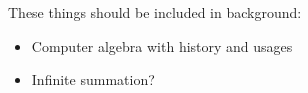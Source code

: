 These things should be included in background:
\begin{itemize}
  \item Computer algebra with history and usages
  \item Infinite summation?
\end{itemize}
